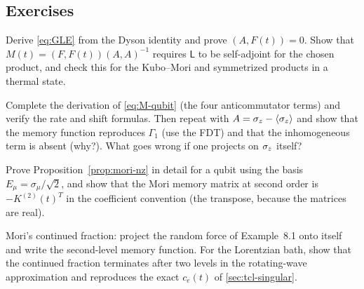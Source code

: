 \subsection{Exercises}

\begin{exercise}\label{ex:8-1}
Derive \cref{eq:GLE} from the Dyson identity and prove $(A,F(t))=0$.
Show that $M(t)=(F,F(t))(A,A)^{-1}$ requires $\mathsf L$ to be self-adjoint for the chosen product, and check this for the Kubo--Mori and symmetrized products in a thermal state.
\end{exercise}

\begin{exercise}\label{ex:8-2}
Complete the derivation of \cref{eq:M-qubit} (the four anticommutator terms) and verify the rate and shift formulas.
Then repeat with $A=\sigma_z-\langle\sigma_z\rangle$ and show that the memory function reproduces $\Gamma_1$ (use the FDT) and that the inhomogeneous term is absent (why?).
What goes wrong if one projects on $\sigma_z$ itself?
\end{exercise}

\begin{exercise}\label{ex:8-3}
Prove Proposition~\ref{prop:mori-nz} in detail for a qubit using the basis $E_\mu=\sigma_\mu/\sqrt2$, and show that the Mori memory matrix at second order is $-K^{(2)}(t)^T$ in the coefficient convention (the transpose, because the matrices are real).
\end{exercise}

\begin{exercise}\label{ex:8-4}
Mori's continued fraction: project the random force of Example~8.1 onto itself and write the second-level memory function.
For the Lorentzian bath, show that the continued fraction terminates after two levels in the rotating-wave approximation and reproduces the exact $c_e(t)$ of \cref{sec:tcl-singular}.
\end{exercise}

\clearpage

